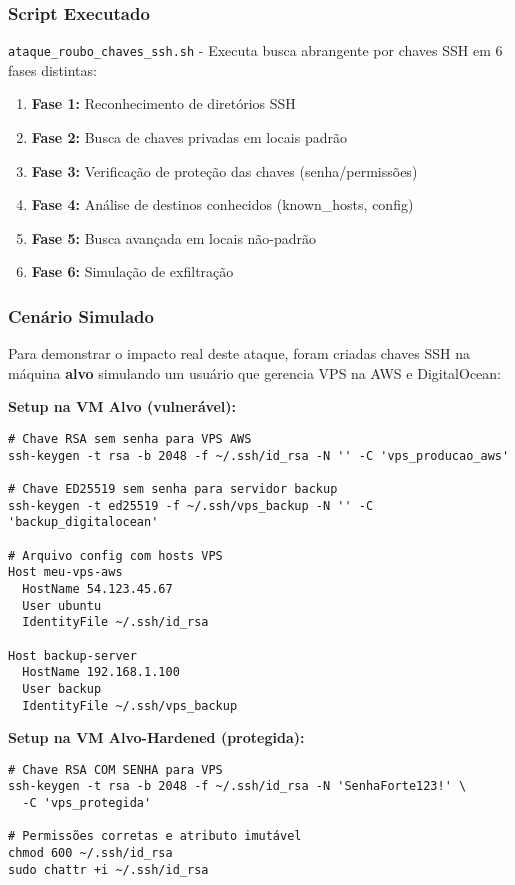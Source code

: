 \documentclass[12pt]{article}
\begin{document}
\subsubsection{Script Executado}
\texttt{ataque\_roubo\_chaves\_ssh.sh} - Executa busca abrangente por chaves SSH em 6 fases distintas:
\begin{enumerate}
    \item \textbf{Fase 1:} Reconhecimento de diretórios SSH
    \item \textbf{Fase 2:} Busca de chaves privadas em locais padrão
    \item \textbf{Fase 3:} Verificação de proteção das chaves (senha/permissões)
    \item \textbf{Fase 4:} Análise de destinos conhecidos (known\_hosts, config)
    \item \textbf{Fase 5:} Busca avançada em locais não-padrão
    \item \textbf{Fase 6:} Simulação de exfiltração
\end{enumerate}

\subsubsection{Cenário Simulado}

Para demonstrar o impacto real deste ataque, foram criadas chaves SSH na máquina \textbf{alvo} simulando um usuário que gerencia VPS na AWS e DigitalOcean:

\textbf{Setup na VM Alvo (vulnerável):}
\begin{verbatim}
# Chave RSA sem senha para VPS AWS
ssh-keygen -t rsa -b 2048 -f ~/.ssh/id_rsa -N '' -C 'vps_producao_aws'

# Chave ED25519 sem senha para servidor backup
ssh-keygen -t ed25519 -f ~/.ssh/vps_backup -N '' -C 'backup_digitalocean'

# Arquivo config com hosts VPS
Host meu-vps-aws
  HostName 54.123.45.67
  User ubuntu
  IdentityFile ~/.ssh/id_rsa

Host backup-server
  HostName 192.168.1.100
  User backup
  IdentityFile ~/.ssh/vps_backup
\end{verbatim}

\textbf{Setup na VM Alvo-Hardened (protegida):}
\begin{verbatim}
# Chave RSA COM SENHA para VPS
ssh-keygen -t rsa -b 2048 -f ~/.ssh/id_rsa -N 'SenhaForte123!' \
  -C 'vps_protegida'

# Permissões corretas e atributo imutável
chmod 600 ~/.ssh/id_rsa
sudo chattr +i ~/.ssh/id_rsa
\end{verbatim}
\end{document}
